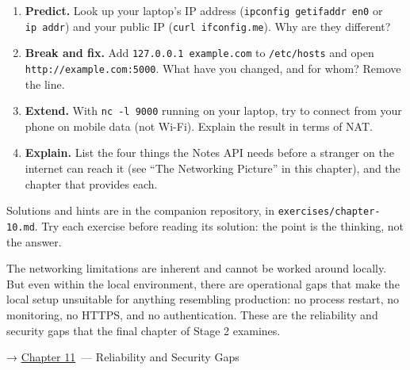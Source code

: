 \begin{enumerate}
\def\labelenumi{\arabic{enumi}.}
\tightlist
\item
  \textbf{Predict.} Look up your laptop's IP address (\texttt{ipconfig\ getifaddr\ en0} or \texttt{ip\ addr}) and your public IP (\texttt{curl\ ifconfig.me}). Why are they different?
\item
  \textbf{Break and fix.} Add \texttt{127.0.0.1\ example.com} to \texttt{/etc/hosts} and open \texttt{http:/}\allowbreak{}\texttt{/}\allowbreak{}\texttt{example.com:5000}. What have you changed, and for whom? Remove the line.
\item
  \textbf{Extend.} With \texttt{nc\ -l\ 9000} running on your laptop, try to connect from your phone on mobile data (not Wi-Fi). Explain the result in terms of NAT.
\item
  \textbf{Explain.} List the four things the Notes API needs before a stranger on the internet can reach it (see ``The Networking Picture'' in this chapter), and the chapter that provides each.
\end{enumerate}

\noindent{}Solutions and hints are in the companion repository, in \texttt{exercises/}\allowbreak{}\texttt{chapter-10.md}. Try each exercise before reading its solution: the point is the thinking, not the answer.

\label{10-networking-limitations:whats-next}

The networking limitations are inherent and cannot be worked around locally. But even within the local environment, there are operational gaps that make the local setup unsuitable for anything resembling production: no process restart, no monitoring, no HTTPS, and no authentication. These are the reliability and security gaps that the final chapter of Stage 2 examines.

\noindent{}→ \hyperref[ch:11-reliability-security-gaps]{Chapter 11}~--- Reliability and Security Gaps
